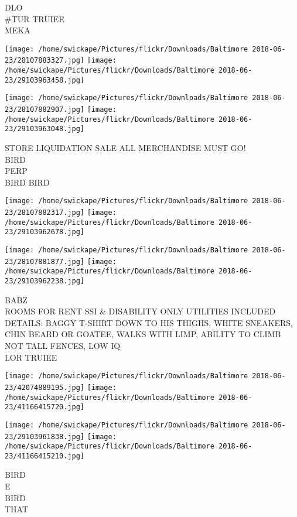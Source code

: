 \documentclass[10pt,letterpaper]{article}
\begin{document}
DLO\\
\#TUR TRUIEE\\
MEKA\\
\pagebreak

\texttt{[image: /home/swickape/Pictures/flickr/Downloads/Baltimore 2018-06-23/28107883327.jpg]}
\texttt{[image: /home/swickape/Pictures/flickr/Downloads/Baltimore 2018-06-23/29103963458.jpg]}

\texttt{[image: /home/swickape/Pictures/flickr/Downloads/Baltimore 2018-06-23/28107882907.jpg]}
\texttt{[image: /home/swickape/Pictures/flickr/Downloads/Baltimore 2018-06-23/29103963048.jpg]}

STORE LIQUIDATION SALE ALL MERCHANDISE MUST GO!\\
BIRD\\
PERP\\
BIRD BIRD\\
\pagebreak

\texttt{[image: /home/swickape/Pictures/flickr/Downloads/Baltimore 2018-06-23/28107882317.jpg]}
\texttt{[image: /home/swickape/Pictures/flickr/Downloads/Baltimore 2018-06-23/29103962678.jpg]}

\texttt{[image: /home/swickape/Pictures/flickr/Downloads/Baltimore 2018-06-23/28107881877.jpg]}
\texttt{[image: /home/swickape/Pictures/flickr/Downloads/Baltimore 2018-06-23/29103962238.jpg]}

BABZ\\
ROOMS FOR RENT SSI \& DISABILITY ONLY UTILITIES INCLUDED\\
DETAILS: BAGGY T{-}SHIRT DOWN TO HIS THIGHS, WHITE SNEAKERS, CHIN BEARD OR GOATEE, WALKS WITH LIMP, ABILITY TO CLIMB NOT TALL FENCES, LOW IQ\\
LOR TRUIEE\\
\pagebreak

\texttt{[image: /home/swickape/Pictures/flickr/Downloads/Baltimore 2018-06-23/42074889195.jpg]}
\texttt{[image: /home/swickape/Pictures/flickr/Downloads/Baltimore 2018-06-23/41166415720.jpg]}

\texttt{[image: /home/swickape/Pictures/flickr/Downloads/Baltimore 2018-06-23/29103961838.jpg]}
\texttt{[image: /home/swickape/Pictures/flickr/Downloads/Baltimore 2018-06-23/41166415210.jpg]}

BIRD\\
E\\
BIRD\\
THAT\\
\pagebreak
\end{document}
